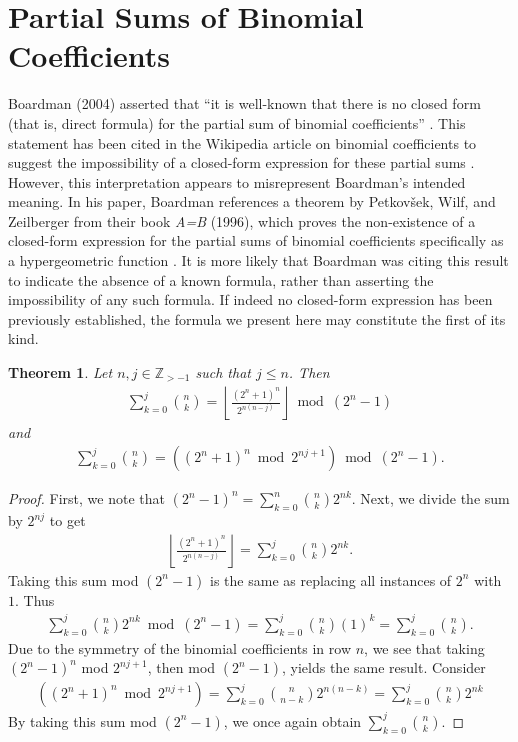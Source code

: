 \documentclass{article}
\theoremstyle{plain}
\newtheorem{theorem}{Theorem}
\theoremstyle{definition}
\newcommand{\floor}[1]{\left\lfloor #1 \right\rfloor}
\newcommand{\Z}{\mathbb{Z}}
\begin{document}
\section{Partial Sums of Binomial Coefficients} \label{section:partialsums}
Boardman (2004) asserted that ``it is well-known that there is no closed form (that is, direct formula) for the partial sum of binomial coefficients'' \cite{boardman2004eggdropnumbers}. This statement has been cited in the Wikipedia article on binomial coefficients to suggest the impossibility of a closed-form expression for these partial sums \cite{wikipedia2024binomialcoefficient}. However, this interpretation appears to misrepresent Boardman's intended meaning. In his paper, Boardman references a theorem by Petkovšek, Wilf, and Zeilberger from their book \textit{A=B} (1996), which proves the non-existence of a closed-form expression for the partial sums of binomial coefficients specifically as a hypergeometric function \cite{petkovsek1996ab}. It is more likely that Boardman was citing this result to indicate the absence of a known formula, rather than asserting the impossibility of any such formula. If indeed no closed-form expression has been previously established, the formula we present here may constitute the first of its kind.

\begin{theorem} \label{proof:binomialcoeffpartialsums}
Let $n,j \in \Z_{>-1}$ such that $j \leq n$. Then
\begin{align*}
\sum_{k=0}^{j} \binom{n}{k}
= \floor{\frac{(2^n+1)^n}{2^{n(n-j)}}} \bmod (2^n-1)
\end{align*}
and
\begin{align*}
\sum_{k=0}^{j} \binom{n}{k}
= \left( (2^n+1)^n \bmod 2^{nj+1} \right) \bmod (2^n-1) .
\end{align*}
\end{theorem}
\begin{proof}
First, we note that $(2^n-1)^n = \sum_{k=0}^n \binom{n}{k} 2^{nk}$.
Next, we divide the sum by $2^{nj}$ to get
\begin{align*}
    \floor{\frac{(2^n+1)^n}{2^{n(n-j)}}}
    = \sum_{k=0}^{j} \binom{n}{k} 2^{nk} .
\end{align*}
Taking this sum mod $(2^n-1)$ is the same as replacing all instances of $2^n$ with $1$. Thus
\begin{align*}
    \sum_{k=0}^{j} \binom{n}{k} 2^{nk} \bmod (2^n-1)
    = \sum_{k=0}^{j} \binom{n}{k} (1)^{k}
    = \sum_{k=0}^{j} \binom{n}{k} .
\end{align*}
Due to the symmetry of the binomial coefficients in row $n$, we see that taking $(2^n-1)^n$ mod $2^{nj+1}$, then mod $(2^n-1)$, yields the same result. Consider
\begin{align*}
    \left( (2^n+1)^n \bmod 2^{nj+1} \right)
    = \sum_{k=0}^{j} \binom{n}{n-k} 2^{n(n-k)}
    = \sum_{k=0}^{j} \binom{n}{k} 2^{nk}
\end{align*}
By taking this sum mod $(2^n-1)$, we once again obtain $\sum_{k=0}^{j} \binom{n}{k}$.
\end{proof}
\end{document}
